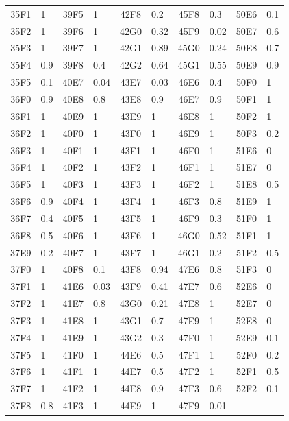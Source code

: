 \documentclass[a4paper 12pt]{article}
\numberwithin{equation}{section}
\begin{document}
\begin{small}
\begin{table}[h!]
\begin{footnotesize}
\begin{tabular}{clclclclcl}
 35F1 &    1 & 39F5 &    1 & 42F8 &  0.2 & 45F8 &  0.3 & 50E6 &  0.1 \\ 
 35F2 &    1 & 39F6 &    1 & 42G0 & 0.32 & 45F9 & 0.02 & 50E7 &  0.6 \\ 
 35F3 &    1 & 39F7 &    1 & 42G1 & 0.89 & 45G0 & 0.24 & 50E8 &  0.7 \\ 
 35F4 &  0.9 & 39F8 &  0.4 & 42G2 & 0.64 & 45G1 & 0.55 & 50E9 &  0.9 \\ 
 35F5 &  0.1 & 40E7 & 0.04 & 43E7 & 0.03 & 46E6 &  0.4 & 50F0 &    1 \\ 
 36F0 &  0.9 & 40E8 &  0.8 & 43E8 &  0.9 & 46E7 &  0.9 & 50F1 &    1 \\ 
 36F1 &    1 & 40E9 &    1 & 43E9 &    1 & 46E8 &    1 & 50F2 &    1 \\ 
 36F2 &    1 & 40F0 &    1 & 43F0 &    1 & 46E9 &    1 & 50F3 &  0.2 \\ 
 36F3 &    1 & 40F1 &    1 & 43F1 &    1 & 46F0 &    1 & 51E6 &    0 \\ 
 36F4 &    1 & 40F2 &    1 & 43F2 &    1 & 46F1 &    1 & 51E7 &    0 \\ 
 36F5 &    1 & 40F3 &    1 & 43F3 &    1 & 46F2 &    1 & 51E8 &  0.5 \\ 
 36F6 &  0.9 & 40F4 &    1 & 43F4 &    1 & 46F3 &  0.8 & 51E9 &    1 \\ 
 36F7 &  0.4 & 40F5 &    1 & 43F5 &    1 & 46F9 &  0.3 & 51F0 &    1 \\ 
 36F8 &  0.5 & 40F6 &    1 & 43F6 &    1 & 46G0 & 0.52 & 51F1 &    1 \\ 
 37E9 &  0.2 & 40F7 &    1 & 43F7 &    1 & 46G1 &  0.2 & 51F2 &  0.5 \\ 
 37F0 &    1 & 40F8 &  0.1 & 43F8 & 0.94 & 47E6 &  0.8 & 51F3 &    0 \\ 
 37F1 &    1 & 41E6 & 0.03 & 43F9 & 0.41 & 47E7 &  0.6 & 52E6 &    0 \\ 
 37F2 &    1 & 41E7 &  0.8 & 43G0 & 0.21 & 47E8 &    1 & 52E7 &    0 \\ 
 37F3 &    1 & 41E8 &    1 & 43G1 &  0.7 & 47E9 &    1 & 52E8 &    0 \\ 
 37F4 &    1 & 41E9 &    1 & 43G2 &  0.3 & 47F0 &    1 & 52E9 &  0.1 \\ 
 37F5 &    1 & 41F0 &    1 & 44E6 &  0.5 & 47F1 &    1 & 52F0 &  0.2 \\ 
 37F6 &    1 & 41F1 &    1 & 44E7 &  0.5 & 47F2 &    1 & 52F1 &  0.5 \\ 
 37F7 &    1 & 41F2 &    1 & 44E8 &  0.9 & 47F3 &  0.6 & 52F2 &  0.1 \\ 
 37F8 &  0.8 & 41F3 &    1 & 44E9 &    1 & 47F9 & 0.01 &  &  \\ 

\end{tabular}
\end{footnotesize}
\end{table}
\end{small}
\end{document}
